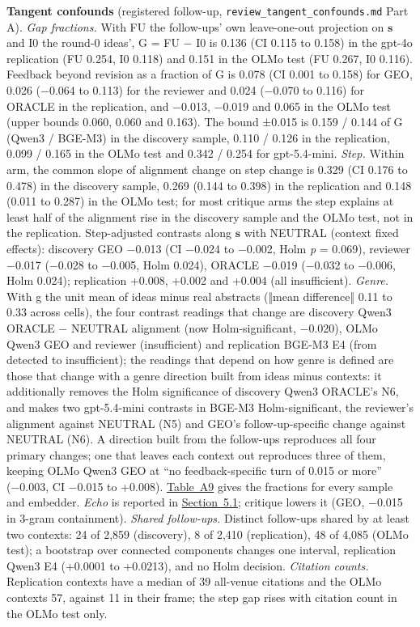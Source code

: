 \documentclass[
  10pt,
]{article}
\begin{document}
\textbf{Tangent confounds} (registered
follow-up,
\texttt{review\_\allowbreak{}tangent\_\allowbreak{}confounds.md}
Part A). \emph{Gap fractions.} With FU
the follow-ups' own leave-one-out
projection on \(\mathbf{s}\) and I0 the
round-0 ideas', G = FU − I0 is 0.136 (CI
0.115 to 0.158) in the gpt-4o
replication (FU 0.254, I0 0.118) and
0.151 in the OLMo test (FU 0.267, I0
0.116). Feedback beyond revision as a
fraction of G is 0.078 (CI 0.001 to
0.158) for GEO, 0.026 (−0.064 to 0.113)
for the reviewer and 0.024 (−0.070 to
0.116) for ORACLE in the replication,
and −0.013, −0.019 and 0.065 in the OLMo
test (upper bounds 0.060, 0.060 and
0.163). The bound ±0.015 is 0.159 /
0.144 of G (Qwen3 / BGE-M3) in the
discovery sample, 0.110 / 0.126 in the
replication, 0.099 / 0.165 in the OLMo
test and 0.342 / 0.254 for gpt-5.4-mini.
\emph{Step.} Within arm, the common
slope of alignment change on step change
is 0.329 (CI 0.176 to 0.478) in the
discovery sample, 0.269 (0.144 to 0.398)
in the replication and 0.148 (0.011 to
0.287) in the OLMo test; for most
critique arms the step explains at least
half of the alignment rise in the
discovery sample and the OLMo test, not
in the replication. Step-adjusted
contrasts along \(\mathbf{s}\) with
NEUTRAL (context fixed effects):
discovery GEO −0.013 (CI −0.024 to
−0.002, Holm \emph{p} = 0.069), reviewer
−0.017 (−0.028 to −0.005, Holm 0.024),
ORACLE −0.019 (−0.032 to −0.006, Holm
0.024); replication +0.008, +0.002 and
+0.004 (all insufficient). \emph{Genre.}
With g the unit mean of ideas minus real
abstracts (‖mean difference‖ 0.11 to
0.33 across cells), the four contrast
readings that change are discovery Qwen3
ORACLE − NEUTRAL alignment (now
Holm-significant, −0.020), OLMo Qwen3
GEO and reviewer (insufficient) and
replication BGE-M3 E4 (from detected to
insufficient); the readings that depend
on how genre is defined are those that
change with a genre direction built from
ideas minus contexts: it additionally
removes the Holm significance of
discovery Qwen3 ORACLE's N6, and makes
two gpt-5.4-mini contrasts in BGE-M3
Holm-significant, the reviewer's
alignment against NEUTRAL (N5) and GEO's
follow-up-specific change against
NEUTRAL (N6). A direction built from the
follow-ups reproduces all four primary
changes; one that leaves each context
out reproduces three of them, keeping
OLMo Qwen3 GEO at ``no feedback-specific
turn of 0.015 or more'' (−0.003, CI
−0.015 to +0.008).
\hyperref[tab:A9]{Table~A9} gives the
fractions for every sample and embedder.
\emph{Echo} is reported in
\hyperref[sec:5.1]{Section~5.1};
critique lowers it (GEO, −0.015 in
3-gram containment). \emph{Shared
follow-ups.} Distinct follow-ups shared
by at least two contexts: 24 of 2,859
(discovery), 8 of 2,410 (replication),
48 of 4,085 (OLMo test); a bootstrap
over connected components changes one
interval, replication Qwen3 E4 (+0.0001
to +0.0213), and no Holm decision.
\emph{Citation counts.} Replication
contexts have a median of 39 all-venue
citations and the OLMo contexts 57,
against 11 in their frame; the step gap
rises with citation count in the OLMo
test only.
\end{document}
